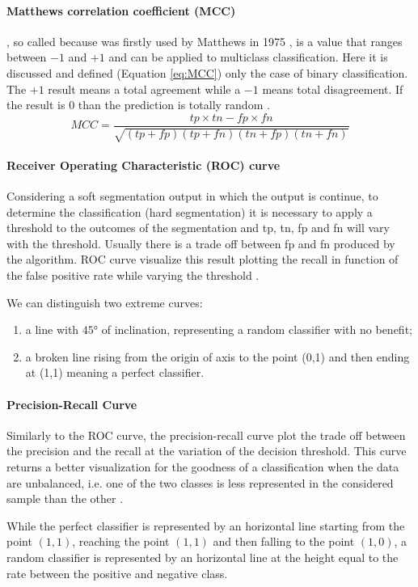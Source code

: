 \documentclass{standalone}
\begin{document}
\paragraph{Matthews correlation coefficient (MCC)}
, so called because was firstly used by Matthews in 1975 \cite{ART:Matthews}, is a value that ranges between $-1$ and $+1$ and can be applied to multiclass classification. Here it is discussed and defined (Equation \ref{eq:MCC}) only the case of binary classification.
The $+1$ result means a total agreement while a $-1$ means total disagreement. If the result is $0$ than the prediction is totally random \cite{ART:Baldi}.
\begin{equation}\label{eq:MCC}
    MCC = \frac {tp \times tn - fp \times fn}
                {\sqrt{(tp + fp)(tp + fn)(tn + fp)(tn + fn)}}
\end{equation}

\paragraph{Receiver Operating Characteristic (ROC) curve}
Considering a soft segmentation output in which the output is continue, to determine the classification (hard segmentation) it is necessary to apply a threshold to the outcomes of the segmentation and tp, tn, fp and fn will vary with the threshold. Usually there is a trade off between fp and fn produced by the algorithm.
ROC curve visualize this result plotting the recall in function of the false positive rate while varying the threshold \cite{ART:Baldi}.

We can distinguish two extreme curves:
\begin{enumerate}
    \item a line with $45°$ of inclination, representing a random classifier with no benefit;
    \item a broken line rising from the origin of axis to the point (0,1) and then ending at (1,1) meaning a perfect classifier.
\end{enumerate}

\paragraph{Precision-Recall Curve}

Similarly to the ROC curve, the precision-recall curve plot the trade off between the precision and the recall at the variation of the decision threshold.
This curve returns a better visualization for the goodness of a classification when the data are unbalanced, i.e. one of the two classes is less represented in the considered sample than the other \cite{ART:AUCPR}.

While the perfect classifier is represented by an horizontal line starting from the point $(1,1)$, reaching the point $(1,1)$ and then falling to the point $(1,0)$, a random classifier is represented by an horizontal line at the height equal to the rate between the positive and negative class.
\end{document}
